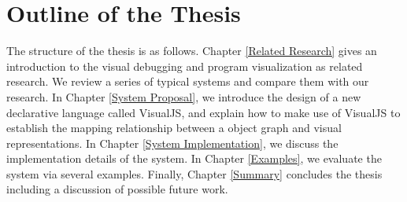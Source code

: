 \section {Outline of the Thesis}
The structure of the thesis is as follows. Chapter \ref{Related Research} gives an introduction to the visual debugging and program visualization as related research. We review a series of typical systems and compare them with our research. In Chapter \ref{System Proposal}, we introduce the design of a new declarative language called VisualJS, and explain how to make use of VisualJS to establish the mapping relationship between a object graph and visual representations. In Chapter \ref{System Implementation}, we discuss the implementation details of the system. In Chapter \ref{Examples}, we evaluate the system via several examples. Finally, Chapter \ref{Summary} concludes the thesis including a discussion of possible future work.
